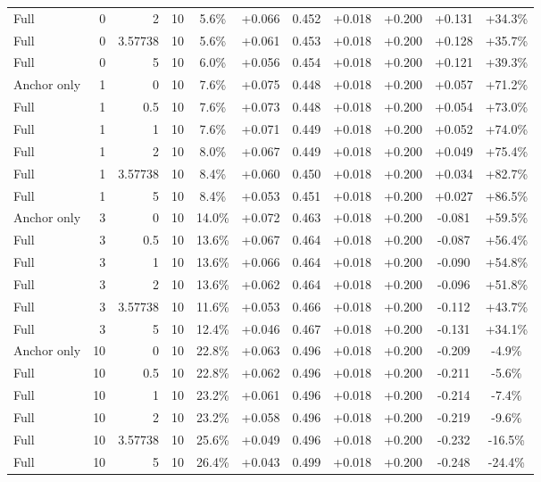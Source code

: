 \begin{table}[htbp]
\begin{tabular}{lrrrccccccc}
Full & 0 & 2 & 10 & 5.6\% & +0.066 & 0.452 & +0.018 & +0.200 & +0.131 & +34.3\% \\
Full & 0 & 3.57738 & 10 & 5.6\% & +0.061 & 0.453 & +0.018 & +0.200 & +0.128 & +35.7\% \\
Full & 0 & 5 & 10 & 6.0\% & +0.056 & 0.454 & +0.018 & +0.200 & +0.121 & +39.3\% \\
Anchor only & 1 & 0 & 10 & 7.6\% & +0.075 & 0.448 & +0.018 & +0.200 & +0.057 & +71.2\% \\
Full & 1 & 0.5 & 10 & 7.6\% & +0.073 & 0.448 & +0.018 & +0.200 & +0.054 & +73.0\% \\
Full & 1 & 1 & 10 & 7.6\% & +0.071 & 0.449 & +0.018 & +0.200 & +0.052 & +74.0\% \\
Full & 1 & 2 & 10 & 8.0\% & +0.067 & 0.449 & +0.018 & +0.200 & +0.049 & +75.4\% \\
Full & 1 & 3.57738 & 10 & 8.4\% & +0.060 & 0.450 & +0.018 & +0.200 & +0.034 & +82.7\% \\
Full & 1 & 5 & 10 & 8.4\% & +0.053 & 0.451 & +0.018 & +0.200 & +0.027 & +86.5\% \\
Anchor only & 3 & 0 & 10 & 14.0\% & +0.072 & 0.463 & +0.018 & +0.200 & -0.081 & +59.5\% \\
Full & 3 & 0.5 & 10 & 13.6\% & +0.067 & 0.464 & +0.018 & +0.200 & -0.087 & +56.4\% \\
Full & 3 & 1 & 10 & 13.6\% & +0.066 & 0.464 & +0.018 & +0.200 & -0.090 & +54.8\% \\
Full & 3 & 2 & 10 & 13.6\% & +0.062 & 0.464 & +0.018 & +0.200 & -0.096 & +51.8\% \\
Full & 3 & 3.57738 & 10 & 11.6\% & +0.053 & 0.466 & +0.018 & +0.200 & -0.112 & +43.7\% \\
Full & 3 & 5 & 10 & 12.4\% & +0.046 & 0.467 & +0.018 & +0.200 & -0.131 & +34.1\% \\
Anchor only & 10 & 0 & 10 & 22.8\% & +0.063 & 0.496 & +0.018 & +0.200 & -0.209 & -4.9\% \\
Full & 10 & 0.5 & 10 & 22.8\% & +0.062 & 0.496 & +0.018 & +0.200 & -0.211 & -5.6\% \\
Full & 10 & 1 & 10 & 23.2\% & +0.061 & 0.496 & +0.018 & +0.200 & -0.214 & -7.4\% \\
Full & 10 & 2 & 10 & 23.2\% & +0.058 & 0.496 & +0.018 & +0.200 & -0.219 & -9.6\% \\
Full & 10 & 3.57738 & 10 & 25.6\% & +0.049 & 0.496 & +0.018 & +0.200 & -0.232 & -16.5\% \\
Full & 10 & 5 & 10 & 26.4\% & +0.043 & 0.499 & +0.018 & +0.200 & -0.248 & -24.4\% \\

\end{tabular}
\end{table}
